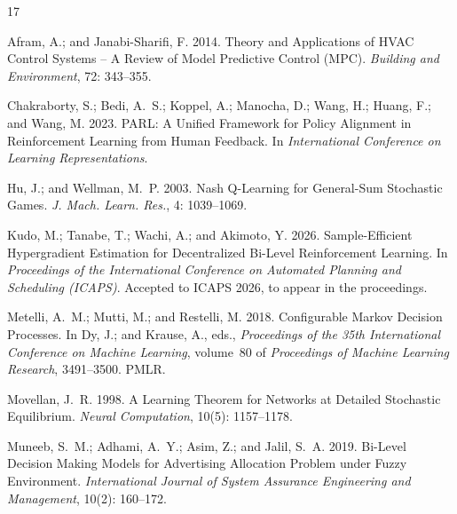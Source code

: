 \documentclass[letterpaper]{article} %
\begin{document}
% 
\begin{thebibliography}{17}
\providecommand{\natexlab}[1]{#1}

Afram, A.; and Janabi-Sharifi, F. 2014.
\newblock Theory and Applications of HVAC Control Systems – A Review of Model Predictive Control (MPC).
\newblock \emph{Building and Environment}, 72: 343--355.

Chakraborty, S.; Bedi, A.~S.; Koppel, A.; Manocha, D.; Wang, H.; Huang, F.; and Wang, M. 2023.
\newblock PARL: A Unified Framework for Policy Alignment in Reinforcement Learning from Human Feedback.
\newblock In \emph{International Conference on Learning Representations}.

Hu, J.; and Wellman, M.~P. 2003.
\newblock Nash Q-Learning for General-Sum Stochastic Games.
\newblock \emph{J. Mach. Learn. Res.}, 4: 1039–1069.

Kudo, M.; Tanabe, T.; Wachi, A.; and Akimoto, Y. 2026.
\newblock Sample-Efficient Hypergradient Estimation for Decentralized Bi-Level Reinforcement Learning.
\newblock In \emph{Proceedings of the International Conference on Automated Planning and Scheduling (ICAPS)}.
\newblock Accepted to ICAPS 2026, to appear in the proceedings.

Metelli, A.~M.; Mutti, M.; and Restelli, M. 2018.
\newblock Configurable {M}arkov Decision Processes.
\newblock In Dy, J.; and Krause, A., eds., \emph{Proceedings of the 35th International Conference on Machine Learning}, volume~80 of \emph{Proceedings of Machine Learning Research}, 3491--3500. PMLR.

Movellan, J.~R. 1998.
\newblock A Learning Theorem for Networks at Detailed Stochastic Equilibrium.
\newblock \emph{Neural Computation}, 10(5): 1157--1178.

Muneeb, S.~M.; Adhami, A.~Y.; Asim, Z.; and Jalil, S.~A. 2019.
\newblock Bi-Level Decision Making Models for Advertising Allocation Problem under Fuzzy Environment.
\newblock \emph{International Journal of System Assurance Engineering and Management}, 10(2): 160--172.


\end{thebibliography}
\end{document}

